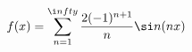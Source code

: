 \documentclass[preview]{standalone}
\begin{document}
\begin{align*}
f(x) = \sum_{ n =1}^{\i n fty} \frac{2(-1)^{ n +1}}{ n } \si n ( n x)
\end{align*}
\end{document}
